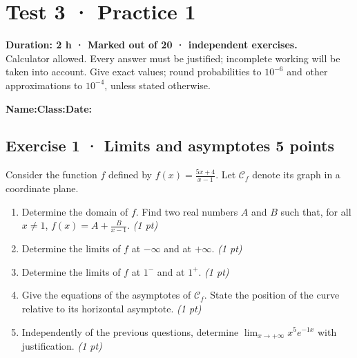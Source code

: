 \mxnewpage{}\label{sujet:4-1}

\section*{Test 3 · Practice 1}


\textbf{Duration: 2 h · Marked out of 20 ·  independent exercises.}\\Calculator allowed. Every answer must be justified; incomplete working will be taken into account. Give exact values; round probabilities to $10^{-6}$ and other approximations to $10^{-4}$, unless stated otherwise.

\smallskip\textbf{Name:}\enspace\dotfill\quad\textbf{Class:}\enspace\dotfill\quad\textbf{Date:}\enspace\dotfill

\subsection*{Exercise 1 · Limits and asymptotes \hfill 5 points}Consider the function $f$ defined by $f(x)=\frac{5x+4}{x-1}$. Let $\mathcal C_f$ denote its graph in a coordinate plane.

\begin{enumerate}

\item Determine the domain of $f$. Find two real numbers $A$ and $B$ such that, for all $x\ne1$, $f(x)=A+\frac B{x-1}$. \hfill\textit{(1 pt)}

\item Determine the limits of $f$ at $-\infty$ and at $+\infty$. \hfill\textit{(1 pt)}

\item Determine the limits of $f$ at $1^-$ and at $1^+$. \hfill\textit{(1 pt)}

\item Give the equations of the asymptotes of $\mathcal C_f$. State the position of the curve relative to its horizontal asymptote. \hfill\textit{(1 pt)}

\item Independently of the previous questions, determine $\displaystyle\lim_{x\to+\infty}x^{5}e^{-1x}$ with justification. \hfill\textit{(1 pt)}

\end{enumerate}

